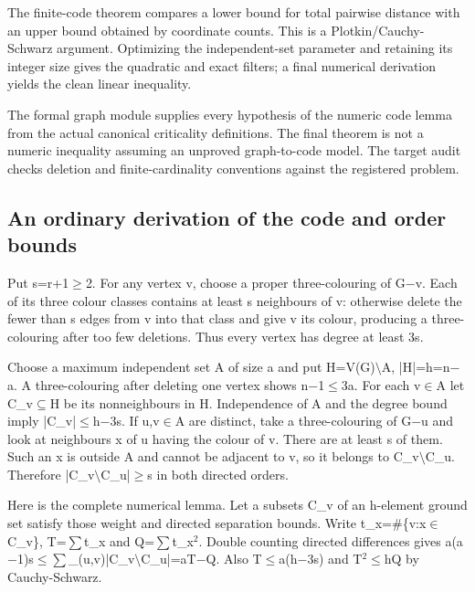 \documentclass[11pt,a4paper]{article}
\begin{document}
The finite-code theorem compares a lower bound for total pairwise distance with an upper bound obtained by coordinate counts. This is a Plotkin/Cauchy-Schwarz argument. Optimizing the independent-set parameter and retaining its integer size gives the quadratic and exact filters; a final numerical derivation yields the clean linear inequality.

The formal graph module supplies every hypothesis of the numeric code lemma from the actual canonical criticality definitions. The final theorem is not a numeric inequality assuming an unproved graph-to-code model. The target audit checks deletion and finite-cardinality conventions against the registered problem.

\subsection{An ordinary derivation of the code and order bounds}
Put s=r+1\ensuremath{\geq}2. For any vertex v, choose a proper three-colouring of G\ensuremath{-}v. Each of its three colour classes contains at least s neighbours of v: otherwise delete the fewer than s edges from v into that class and give v its colour, producing a three-colouring after too few deletions. Thus every vertex has degree at least 3s.

Choose a maximum independent set A of size a and put H=V(G)\ensuremath{\setminus}A, |H|=h=n\ensuremath{-}a. A three-colouring after deleting one vertex shows n\ensuremath{-}1\ensuremath{\leq}3a. For each v\ensuremath{\in}A let C\_v\ensuremath{\subseteq}H be its nonneighbours in H. Independence of A and the degree bound imply |C\_v|\ensuremath{\leq}h\ensuremath{-}3s. If u,v\ensuremath{\in}A are distinct, take a three-colouring of G\ensuremath{-}u and look at neighbours x of u having the colour of v. There are at least s of them. Such an x is outside A and cannot be adjacent to v, so it belongs to C\_v\ensuremath{\setminus}C\_u. Therefore |C\_v\ensuremath{\setminus}C\_u|\ensuremath{\geq}s in both directed orders.

Here is the complete numerical lemma. Let a subsets C\_v of an h-element ground set satisfy those weight and directed separation bounds. Write t\_x=\#\{v:x\ensuremath{\in}C\_v\}, T=\ensuremath{\sum}t\_x and Q=\ensuremath{\sum}t\_x\ensuremath{^2}. Double counting directed differences gives a(a\ensuremath{-}1)s\ensuremath{\leq}\ensuremath{\sum}\_(u,v)|C\_v\ensuremath{\setminus}C\_u|=aT\ensuremath{-}Q. Also T\ensuremath{\leq}a(h\ensuremath{-}3s) and T\ensuremath{^2}\ensuremath{\leq}hQ by Cauchy-Schwarz.
\end{document}

